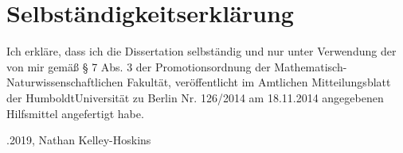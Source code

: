 
\chapter{Selbst{\"a}ndigkeitserkl{\"a}rung}

Ich erkl{\"a}re, dass ich die Dissertation selbständig und nur unter Verwendung der von mir gem{\"a}{\ss} § 7 Abs. 3 der Promotionsordnung der Mathematisch-Naturwissenschaftlichen Fakult{\"a}t, veröffentlicht im Amtlichen Mitteilungsblatt der HumboldtUniversität zu Berlin Nr. 126/2014 am 18.11.2014 angegebenen Hilfsmittel angefertigt habe.



\CaptionBlankLine
\CaptionBlankLine
\CaptionBlankLine
\CaptionBlankLine
{}.2019, Nathan Kelley-Hoskins

